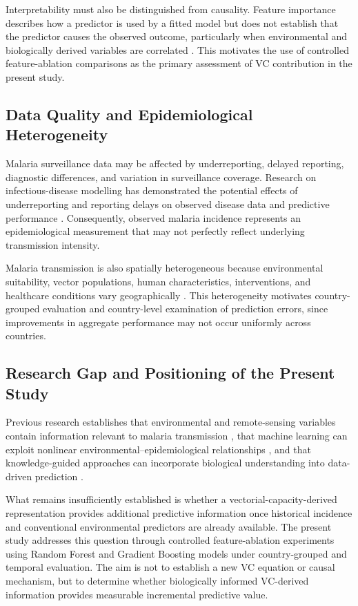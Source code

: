 \documentclass[10pt,twocolumn]{article}
\begin{document}
Interpretability must also be distinguished from causality. Feature
importance describes how a predictor is used by a fitted model but does
not establish that the predictor causes the observed outcome,
particularly when environmental and biologically derived variables are
correlated \parencite{FanLiuSun2023,Qiu2022,AlMeslamani2024}. This
motivates the use of controlled feature-ablation comparisons as the
primary assessment of VC contribution in the present study.


\subsection{Data Quality and Epidemiological Heterogeneity}

Malaria surveillance data may be affected by underreporting, delayed
reporting, diagnostic differences, and variation in surveillance
coverage. Research on infectious-disease modelling has demonstrated
the potential effects of underreporting and reporting delays on
observed disease data and predictive performance
\parencite{Arima2024,Beesley2022}. Consequently, observed malaria
incidence represents an epidemiological measurement that may not
perfectly reflect underlying transmission intensity.

Malaria transmission is also spatially heterogeneous because
environmental suitability, vector populations, human characteristics,
interventions, and healthcare conditions vary geographically
\parencite{Odhiambo2020,Wu2023}. This heterogeneity motivates
country-grouped evaluation and country-level examination of prediction
errors, since improvements in aggregate performance may not occur
uniformly across countries.


\subsection{Research Gap and Positioning of the Present Study}

Previous research establishes that environmental and remote-sensing
variables contain information relevant to malaria transmission
\parencite{MafweleLee2022,Okiring2021,Cuellar2025}, that machine
learning can exploit nonlinear environmental--epidemiological
relationships \parencite{Odu2021,Masinde2020,Khan2024}, and that
knowledge-guided approaches can incorporate biological understanding
into data-driven prediction \parencite{Jhutty2022,Karpatne2024,Ye2025}.

What remains insufficiently established is whether a
vectorial-capacity-derived representation provides additional
predictive information once historical incidence and conventional
environmental predictors are already available. The present study
addresses this question through controlled feature-ablation experiments
using Random Forest and Gradient Boosting models under country-grouped
and temporal evaluation. The aim is not to establish a new VC equation
or causal mechanism, but to determine whether biologically informed
VC-derived information provides measurable incremental predictive
value.
\end{document}
